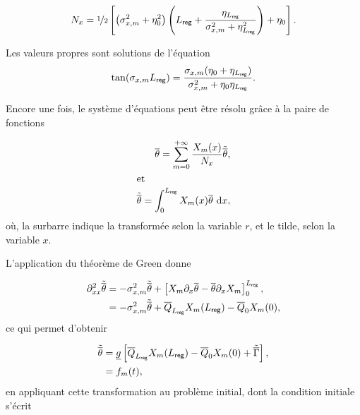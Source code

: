 \begin{equation}
	N_x = \nicefrac{1}{2}\left[\left(\sigma_{x,m}^2 + \eta_0^2 \right)\left(L_{\sf reg}+\frac{\eta_{L_{\sf reg}}}{\sigma_{x,m}^2 + \eta_{L_{\sf reg}}^2}\right)+\eta_0\right].
\end{equation}

Les valeurs propres sont solutions de l'équation
\begin{equation}
	\tan(\sigma_{x,m}L_{\sf reg}) = \frac{\sigma_{x,m}(\eta_0+\eta_{L_{\sf reg}})}{\sigma_{x,m}^2+\eta_0\eta_{L_{\sf reg}}}.
\end{equation}

Encore une fois, le système d'équations peut être résolu grâce à la paire de fonctions

\begin{subequations}
	\begin{align}
		\overline{\theta} = \sum_{m=0}^{+\infty}\frac{X_m(x)}{N_x}\tilde{\overline{\theta}},\label{eq:TransfoInteg_Inversion_X}\\
		\intertext{et}
		\tilde{\overline{\theta}} = \int_{0}^{L_{\sf reg}} X_m(x)\overline{\theta}\ \deriv x,\label{eq:TransfoInter_TransfoInteg_X}
	\end{align}
\end{subequations}
où, la surbarre indique la transformée selon la variable $r$, et le tilde, selon la variable $x$.

L'application du théorème de Green donne

\begin{align}
	\partial_{xx}^2\tilde{\overline{\theta}} &= -\sigma_{x,m}^2\tilde{\overline{\theta}} + \left[X_m\partial_x\overline{\theta}-\overline{\theta}\partial_x X_m\right]_{0}^{L_{\sf reg}},\\
	&= -\sigma_{x,m}^2\tilde{\overline{\theta}} + \overline{Q}_{L_{\sf reg}}X_m(L_{\sf reg}) - \overline{Q}_0X_m(0),\label{eq:TheoremeGreen}
\end{align}
ce qui permet d'obtenir 

\begin{align}
	[\partial_t + \underline{g}(\sigma_{x,m}^2+\underline{k}\sigma_{r,n}^2)]\tilde{\overline{\theta}} &= \underline{g}\left[\overline{Q}_{L_{\sf reg}}X_m(L_{\sf reg}) - \overline{Q}_0X_m(0) + \tilde{\overline{\Gamma}}\right], \label{eq:TheoremeGreen_TransfoInteg}\\
	&=f_m(t),
\end{align}
en appliquant cette transformation au problème initial, dont la condition initiale s'écrit

